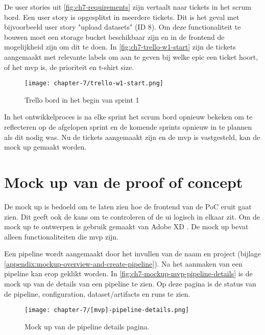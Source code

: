De user stories uit \autoref{fig:ch7-requirements} zijn vertaalt naar tickets in het scrum bord. Een user story is opgesplitst in meerdere tickets. Dit is het geval met bijvoorbeeld user story \string"upload datasets\string" (ID 8). Om deze functionaliteit te bouwen moet een storage bucket beschikbaar zijn en in de frontend de mogelijkheid zijn om dit te doen. In \autoref{fig:ch7-trello-w1-start} zijn de tickets aangemaakt met relevante labels om aan te geven bij welke epic een ticket hoort, of het \acrshort{mvp} is, de prioriteit en t-shirt size.

\begin{figure}[hbt!]
  \centering
  \texttt{[image: chapter-7/trello-w1-start.png]}
  \caption{Trello bord in het begin van sprint 1}
  \label{fig:ch7-trello-w1-start}
\end{figure}

In het ontwikkelproces is na elke sprint het scrum bord opnieuw bekeken om te reflecteren op de afgelopen sprint en de komende sprints opnieuw in te plannen als dit nodig was. Nu de tickets aangemaakt zijn en de \acrshort{mvp} is vastgesteld, kan de mock up gemaakt worden.

\section{Mock up van de proof of concept}\label{sec:ch7-mock-up-van-de-proof-of-concept}
De mock up is bedoeld om te laten zien hoe de frontend van de PoC eruit gaat zien. Dit geeft ook de kans om te controleren of de \acrfull{ui} logisch in elkaar zit. Om de mock up te ontwerpen is gebruik gemaakt van Adobe XD \cite{adobe-xd}. De mock up bevat alleen functionaliteiten die \acrshort{mvp} zijn. 

Een pipeline wordt aangemaakt door het invullen van de naam en project (bijlage \ref{appendix:mockup-overview-and-create-pipeline}). Na het aanmaken van een pipeline kan erop geklikt worden. In \autoref{fig:ch7-mockup-mvp-pipeline-details} is de mock up van de details van een pipeline te zien. Op deze pagina is de status van de pipeline, configuration, dataset/\glspl{artifact} en runs te zien.

\begin{figure}[hbt!]
  \centering
  \texttt{[image: chapter-7/[mvp]-pipeline-details.png]}
  \caption{Mock up van de pipeline details pagina.}
  \label{fig:ch7-mockup-mvp-pipeline-details}
\end{figure}

